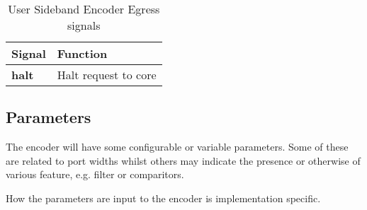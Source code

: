 \begin{table}[htp]
    \centering
    \caption{User Sideband Encoder Egress signals}
    \label{tab:ingress-side-band}
    \begin{tabulary}{\textwidth}{|l|l|}
        \hline
        \textbf {Signal} & \textbf {Function} \\
        \hline
        \textbf {halt}& Halt request to core \\
        \hline
    \end{tabulary}
\end{table}


\subsection {Parameters}

The encoder will have some configurable or variable parameters. Some of these are related to port widths whilst others may indicate the presence or otherwise of various feature, e.g. filter or comparitors.

How the parameters are input to the encoder is implementation specific.  

